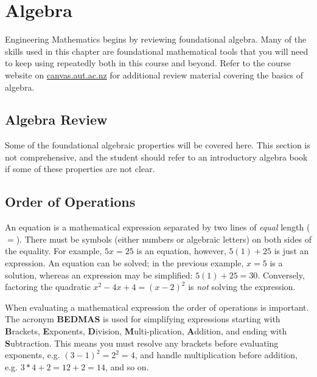 \chapter{Algebra}
Engineering Mathematics begins by reviewing foundational algebra. Many of the skills used in this chapter are foundational mathematical tools that you will need to keep using repeatedly both in this course and beyond. Refer to the course website on \url{canvas.aut.ac.nz} for additional review material covering the basics of algebra.

\section{Algebra Review}\label{sec:introAlgebra}
Some of the foundational algebraic properties will be covered here. This section is not comprehensive, and the student should refer to an introductory algebra book if some of these properties are not clear.

\section*{Order of Operations}
An equation is a mathematical expression separated by two lines of \textit{equal} length ($=$). There must be symbols (either numbers or algebraic letters) on both sides of the equality. For example, $5x=25$ is an equation, however, $5(1)+25$ is just an expression. An equation can be solved; in the previous example, $x=5$ is a solution, whereas an expression may be simplified: $5(1)+25=30$. Conversely, factoring the quadratic $x^2-4x+4=(x-2)^2$ is \textit{not} solving the expression.

When evaluating a mathematical expression the order of operations is important. The acronym \textbf{BEDMAS} is used for simplifying expressions starting with \textbf{B}rackets, \textbf{E}xponents, \textbf{D}ivision, \textbf{M}ulti-\allowbreak plication, \textbf{A}ddition, and ending with \textbf{S}ubtraction. This means you must resolve any brackets before evaluating exponents, e.g. $(3-1)^2=2^2=4$, and handle multiplication before addition, e.g. $3*4+2=12+2=14$, and so on.
